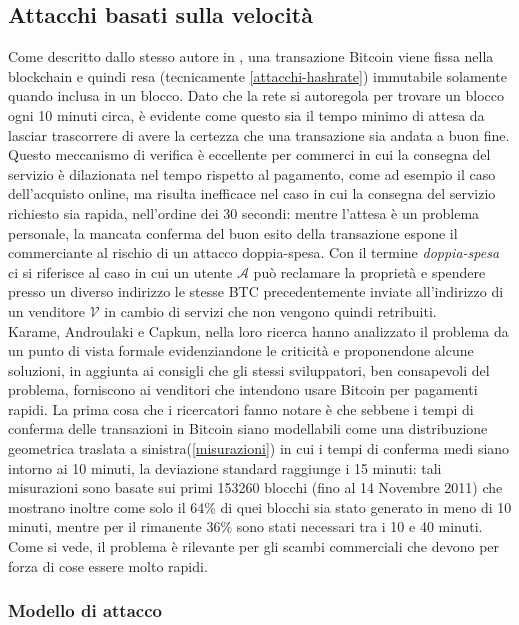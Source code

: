 \subsection{Attacchi basati sulla velocità}\label{double-spending}

Come descritto dallo stesso autore in \cite{bitcoin}, una transazione Bitcoin viene fissa nella blockchain e quindi resa (tecnicamente \ref{attacchi-hashrate}) immutabile solamente quando inclusa in un blocco. Dato che la rete si autoregola per trovare un blocco ogni 10 minuti circa, è evidente come questo sia il tempo minimo di attesa da lasciar trascorrere di avere la certezza che una transazione sia andata a buon fine. Questo meccanismo di verifica è eccellente per commerci in cui la consegna del servizio è dilazionata nel tempo rispetto al pagamento, come ad esempio il caso dell'acquisto online, ma risulta inefficace nel caso in cui la consegna del servizio richiesto sia rapida, nell'ordine dei 30 secondi: mentre l'attesa è un problema personale, la mancata conferma del buon esito della transazione espone il commerciante al rischio di un attacco doppia-spesa. Con il termine \emph{doppia-spesa} ci si riferisce al caso in cui un utente $\mathcal{A}$ può reclamare la proprietà e spendere presso un diverso indirizzo le stesse BTC precedentemente inviate all'indirizzo di un venditore $\mathcal{V}$ in cambio di servizi che non vengono quindi retribuiti.\\
Karame, Androulaki e Capkun, nella loro ricerca \cite{doublespendig_fast} hanno analizzato il problema da un punto di vista formale evidenziandone le criticità e proponendone alcune soluzioni, in aggiunta ai consigli che gli stessi sviluppatori, ben consapevoli del problema, forniscono ai venditori che intendono usare Bitcoin per pagamenti rapidi.
La prima cosa che i ricercatori fanno notare è che sebbene i tempi di conferma delle transazioni in Bitcoin siano modellabili come una distribuzione geometrica traslata a sinistra(\ref{misurazioni}) in cui i tempi di conferma medi siano intorno ai 10 minuti, la deviazione standard raggiunge i 15 minuti: tali misurazioni sono basate sui primi 153260 blocchi (fino al 14 Novembre 2011) che mostrano inoltre come solo il 64\% di quei blocchi sia stato generato in meno di 10 minuti, mentre per il rimanente 36\% sono stati necessari tra i 10 e 40 minuti. Come si vede, il problema è rilevante per gli scambi commerciali che devono per forza di cose essere molto rapidi.

\subsubsection{Modello di attacco}

